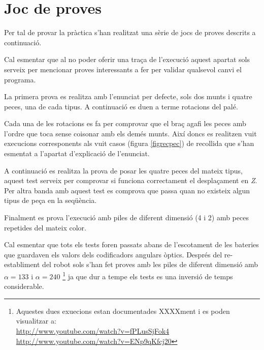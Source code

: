 \section{Joc de proves}

Per tal de provar la pràctica s'han realitzat una sèrie de jocs de proves
descrits a continuació.

Cal esmentar que al no poder oferir una traça de l'execució
aquest apartat sols serveix per mencionar proves interessants a fer
per validar qualsevol canvi el programa.

La primera prova es realitza amb l'enunciat per defecte, sols dos munts i
quatre peces, una de cada tipus. A continuació es duen a terme rotacions
del palé.

Cada una de les rotacions es fa per comprovar que el braç agafi les
peces amb l'ordre que toca sense co\lgem isonar amb els demés munts.
Així doncs es realitzen vuit execucions corresponents als vuit casos
(figura \ref{figrecpec}) de recollida que s'han esmentat a l'apartat
d'explicació de l'enunciat.

A continuació es realitza la prova de posar les quatre peces del mateix tipus,
aquest test serveix per comprovar si funciona correctament el desplaçament
en \emph{Z}. Per altra banda amb aquest test es comprova que passa
quan no existeix algun tipus de peça en la seqüència.

Finalment es prova l'execució amb piles de diferent dimensió (4 i 2)
amb peces repetides del mateix color.

Cal esmentar que tots els tests foren passats abans de l'escotament
de les bateries que guardaven els valors dels codificadors angulars
òptics. Després del re-establiment del robot sols s'han fet proves
amb les piles de diferent dimensió amb $\alpha = 133$ i $\alpha = 240$
\footnote{Aquestes dues exuecions estan documentades XXXXment i es
poden visualitzar a: \\
\url{http://www.youtube.com/watch?v=fPLusSjFok4} \\
\url{http://www.youtube.com/watch?v=ENp9qKfcj20}}
ja que dur a tempe els tests es una inversió de temps considerable.
